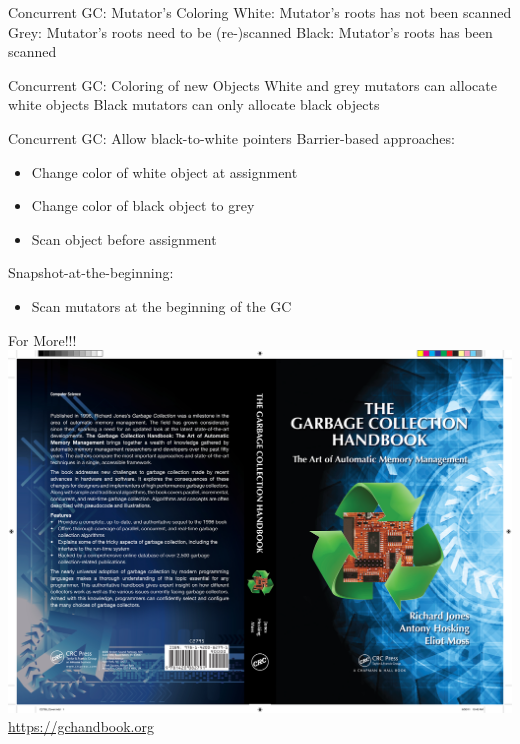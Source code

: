\documentclass[
14pt,
aspectratio=169,
usenames,
dvipsnames,
x11names]{beamer}
\begin{document}
\begin{frame}{Concurrent GC: Mutator's Coloring}
  \alert{White}: Mutator's roots has not been scanned
  \vfill
  \alert{Grey}: Mutator's roots need to be (re-)scanned
  \vfill
  \alert{Black}: Mutator's roots has been scanned
\end{frame}

\begin{frame}{Concurrent GC: Coloring of new Objects}
  White and grey mutators can allocate white objects
  \vfill
  Black mutators can only allocate black objects
\end{frame}

\begin{frame}{Concurrent GC: Allow black-to-white pointers}
  \alert{Barrier-based} approaches:
  \begin{itemize}
  \item Change color of white object at assignment
  \item Change color of black object to grey
  \item Scan object before assignment
  \end{itemize}
  \vfill
  \alert{Snapshot-at-the-beginning}:
  \begin{itemize}
  \item Scan mutators at the beginning of the GC
  \end{itemize}
\end{frame}

\begin{frame}{For More!!!}
  \centering
  \includegraphics[trim=20cm 1cm 1cm 1cm,clip,height=.7\textheight]{gchandbookcover}\\
  \url{https://gchandbook.org}
\end{frame}
\end{document}

